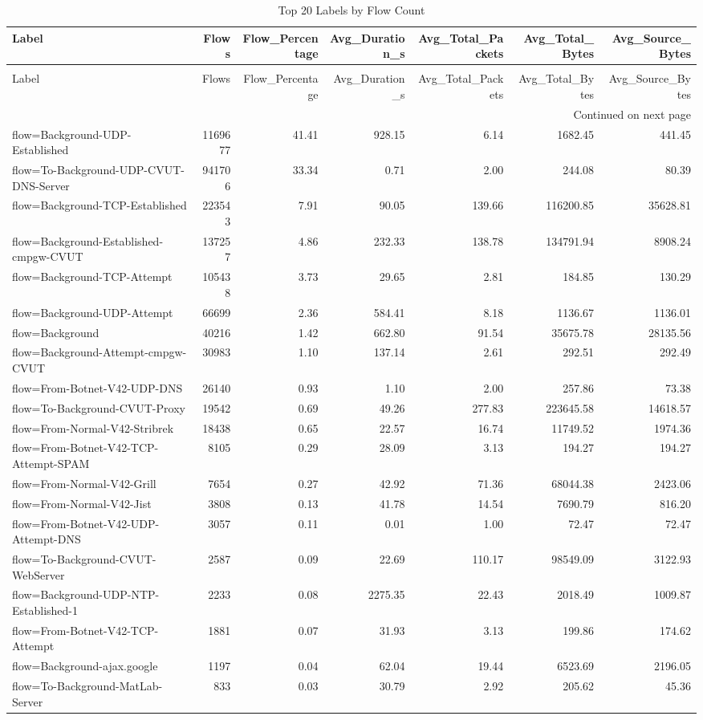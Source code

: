 \begin{longtable}{lrrrrrr}
\caption{Top 20 Labels by Flow Count} \label{tab:label_summary} \\
\toprule
Label & Flows & Flow_Percentage & Avg_Duration_s & Avg_Total_Packets & Avg_Total_Bytes & Avg_Source_Bytes \\
\midrule
\endfirsthead
\caption[]{Top 20 Labels by Flow Count} \\
\toprule
Label & Flows & Flow_Percentage & Avg_Duration_s & Avg_Total_Packets & Avg_Total_Bytes & Avg_Source_Bytes \\
\midrule
\endhead
\midrule
\multicolumn{7}{r}{Continued on next page} \\
\midrule
\endfoot
\bottomrule
\endlastfoot
flow=Background-UDP-Established & 1169677 & 41.41 & 928.15 & 6.14 & 1682.45 & 441.45 \\
flow=To-Background-UDP-CVUT-DNS-Server & 941706 & 33.34 & 0.71 & 2.00 & 244.08 & 80.39 \\
flow=Background-TCP-Established & 223543 & 7.91 & 90.05 & 139.66 & 116200.85 & 35628.81 \\
flow=Background-Established-cmpgw-CVUT & 137257 & 4.86 & 232.33 & 138.78 & 134791.94 & 8908.24 \\
flow=Background-TCP-Attempt & 105438 & 3.73 & 29.65 & 2.81 & 184.85 & 130.29 \\
flow=Background-UDP-Attempt & 66699 & 2.36 & 584.41 & 8.18 & 1136.67 & 1136.01 \\
flow=Background & 40216 & 1.42 & 662.80 & 91.54 & 35675.78 & 28135.56 \\
flow=Background-Attempt-cmpgw-CVUT & 30983 & 1.10 & 137.14 & 2.61 & 292.51 & 292.49 \\
flow=From-Botnet-V42-UDP-DNS & 26140 & 0.93 & 1.10 & 2.00 & 257.86 & 73.38 \\
flow=To-Background-CVUT-Proxy & 19542 & 0.69 & 49.26 & 277.83 & 223645.58 & 14618.57 \\
flow=From-Normal-V42-Stribrek & 18438 & 0.65 & 22.57 & 16.74 & 11749.52 & 1974.36 \\
flow=From-Botnet-V42-TCP-Attempt-SPAM & 8105 & 0.29 & 28.09 & 3.13 & 194.27 & 194.27 \\
flow=From-Normal-V42-Grill & 7654 & 0.27 & 42.92 & 71.36 & 68044.38 & 2423.06 \\
flow=From-Normal-V42-Jist & 3808 & 0.13 & 41.78 & 14.54 & 7690.79 & 816.20 \\
flow=From-Botnet-V42-UDP-Attempt-DNS & 3057 & 0.11 & 0.01 & 1.00 & 72.47 & 72.47 \\
flow=To-Background-CVUT-WebServer & 2587 & 0.09 & 22.69 & 110.17 & 98549.09 & 3122.93 \\
flow=Background-UDP-NTP-Established-1 & 2233 & 0.08 & 2275.35 & 22.43 & 2018.49 & 1009.87 \\
flow=From-Botnet-V42-TCP-Attempt & 1881 & 0.07 & 31.93 & 3.13 & 199.86 & 174.62 \\
flow=Background-ajax.google & 1197 & 0.04 & 62.04 & 19.44 & 6523.69 & 2196.05 \\
flow=To-Background-MatLab-Server & 833 & 0.03 & 30.79 & 2.92 & 205.62 & 45.36 \\
\end{longtable}
